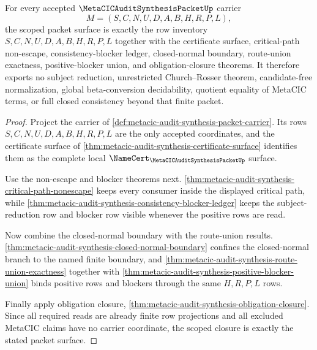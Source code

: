 \begin{theorem}
\label{thm:metacic-audit-synthesis-scope-closure}
For every accepted $\MetaCICAuditSynthesisPacketUp$ carrier
$$
M=(S,C,N,U,D,A,B,H,R,P,L),
$$
the scoped packet surface is exactly the row inventory $S,C,N,U,D,A,B,H,R,P,L$ together with the certificate surface, critical-path non-escape, consistency-blocker ledger, closed-normal boundary, route-union exactness, positive-blocker union, and obligation-closure theorems. It therefore exports no subject reduction, unrestricted Church--Rosser theorem, candidate-free normalization, global beta-conversion decidability, quotient equality of MetaCIC terms, or full closed consistency beyond that finite packet.
\end{theorem}
\begin{proof}
Project the carrier of \autoref{def:metacic-audit-synthesis-packet-carrier}. Its rows $S,C,N,U,D,A,B,H,R,P,L$ are the only accepted coordinates, and the certificate surface of \autoref{thm:metacic-audit-synthesis-certificate-surface} identifies them as the complete local $\NameCert_{\MetaCICAuditSynthesisPacketUp}$ surface.

Use the non-escape and blocker theorems next. \autoref{thm:metacic-audit-synthesis-critical-path-nonescape} keeps every consumer inside the displayed critical path, while \autoref{thm:metacic-audit-synthesis-consistency-blocker-ledger} keeps the subject-reduction row and blocker row visible whenever the positive rows are read.

Now combine the closed-normal boundary with the route-union results. \autoref{thm:metacic-audit-synthesis-closed-normal-boundary} confines the closed-normal branch to the named finite boundary, and \autoref{thm:metacic-audit-synthesis-route-union-exactness} together with \autoref{thm:metacic-audit-synthesis-positive-blocker-union} binds positive rows and blockers through the same $H,R,P,L$ rows.

Finally apply obligation closure, \autoref{thm:metacic-audit-synthesis-obligation-closure}. Since all required reads are already finite row projections and all excluded MetaCIC claims have no carrier coordinate, the scoped closure is exactly the stated packet surface.
\end{proof}


